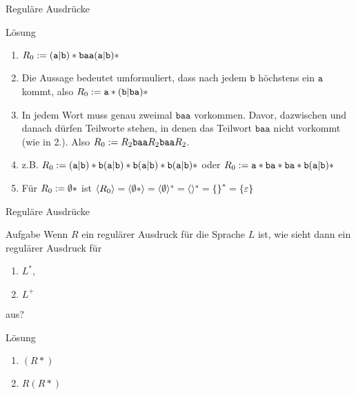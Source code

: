\begin{frame}{Reguläre Ausdrücke}
\newcommand{\any}{(\texttt{a} | \texttt{b}) *}
\begin{block}{Lösung}
	\begin{enumerate}
		\item $R_\theenumi := \any \texttt{baa} \any $
		\item Die Aussage bedeutet umformuliert, dass nach jedem $\texttt{b}$ höchstens ein $\texttt{a}$ kommt, also $R_\theenumi := \texttt{a} * (\texttt{b} | \texttt{ba} ) * $
		\item In jedem Wort muss genau zweimal $\texttt{baa}$ vorkommen. Davor, dazwischen und danach dürfen Teilworte stehen, in denen das Teilwort $\texttt{baa}$ nicht vorkommt (wie in 2.). Also $R_\theenumi := R_2 \texttt{baa} R_2 \texttt{baa} R_2$.
		\item z.B. $R_\theenumi := \any \texttt{b} \any \texttt{b}\any \texttt{b} \any $
		oder $R_\theenumi := \texttt{a} * \texttt{ba} * \texttt{ba} * \texttt{b} \any$
		\item Für $R_\theenumi := \emptyset *$ ist $\lang{R_\theenumi} = \lang{\emptyset *} = \lang{\emptyset}^* = \lang{}^* = \set{}^* = \set{\varepsilon}$
	\end{enumerate}
\end{block}
\end{frame}

\begin{frame}{Reguläre Ausdrücke}
\begin{exampleblock}{Aufgabe}
	Wenn $R$ ein regulärer Ausdruck für die Sprache $L$ ist, wie sieht dann ein regulärer Ausdruck für
	\begin{enumerate}
		\item $L^*$,
		\item $L^+$
	\end{enumerate}
	aus?
\end{exampleblock}
\pause
\begin{block}{Lösung}
	\begin{enumerate}
		\item $(R*)$
		\item $R(R*)$
	\end{enumerate}
\end{block}
\end{frame}